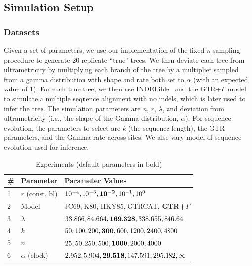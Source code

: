 \subsection{Simulation Setup}
\subsubsection{Datasets}
Given a set of parameters, we use our implementation of the fixed-$n$ sampling procedure  to generate 20 replicate ``true'' trees. We then deviate each tree from ultrametricity by multiplying each branch of the tree by a multiplier sampled from a gamma distribution with shape and rate both set to $\alpha$ (with an expected value of 1). For each true tree, we then use INDELible~\cite{Fletcher2009} and the \gls{GTR}+$\Gamma$ model~\cite{Tavare1986} to simulate a multiple sequence alignment with no indels, which is later used to infer the tree. The simulation parameters are \textit{n}, $r$, $\lambda$, and deviation from ultrametricity (i.e., the shape of the Gamma distribution, $\alpha$). For sequence evolution, the parameters to select are $k$ (the sequence length), the \gls{GTR} parameters, and the Gamma rate across sites. We also vary model of sequence evolution used for inference.

\begin{table}[!ht] %
\caption[Experiments]{Experiments (default parameters in bold)}
\vspace{-0.25in}
\begin{center}
\begin{tabular}{|l|l|l|}
\hline
{\bf\#}&{\bf Parameter} & {\bf Parameter Values}\\
\hline
1&$r$ (const. bl) & $10^{-4}, 10^{-3}, {\bf 10^{-2}}, 10^{-1}, 10^{0}$\\
2& Model & JC69, K80, HKY85, GTRCAT, \textbf{GTR+$\Gamma$}\\
3&$\lambda$ & $33.866, 84.664, {\bf 169.328}, 338.655, 846.64$\\
4&$k$ & $50, 100, 200, {\bf 300}, 600, 1200, 2400, 4800$\\
5&$n$ & $25, 50, 250, 500, {\bf 1000}, 2000, 4000$\\
6& $\alpha$ (clock) & $2.952, 5.904, {\bf 29.518}, 147.591, 295.182, \infty$\\
\hline
\end{tabular}
\end{center}
\label{tab:dualbirth-experiments}
\end{table}

